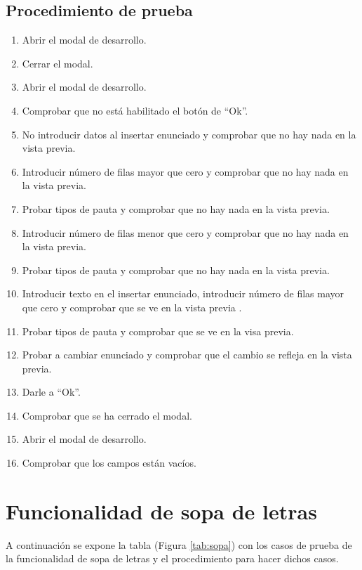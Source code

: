 \subsection{Procedimiento de prueba}
\label{procedimientoPruebas:desarrollo}
\begin{enumerate}
\item Abrir el modal de desarrollo.
\item Cerrar el modal.
\item Abrir el modal de desarrollo.
\item Comprobar que no está habilitado el botón de ``Ok''.
\item No introducir datos al insertar enunciado y comprobar que no hay nada en la vista previa. 
\item Introducir número de filas mayor que cero y comprobar que no hay nada en la vista previa.
\item Probar tipos de pauta y comprobar que no hay nada en la vista previa.
\item Introducir número de filas menor que cero y comprobar que no hay nada en la vista previa.
\item Probar tipos de pauta y comprobar que no hay nada en la vista previa.
\item Introducir texto en el insertar enunciado, introducir número de filas mayor que cero y comprobar que se ve en la vista previa .
\item Probar tipos de pauta y comprobar que se ve en la visa previa.
\item Probar a cambiar enunciado y comprobar que el cambio se refleja en la vista previa.
\item Darle a ``Ok''.
\item Comprobar que se ha cerrado el modal.
\item Abrir el modal de desarrollo.
\item Comprobar que los campos están vacíos.
\end{enumerate}

\section{Funcionalidad de sopa de letras}
\label{planPruebas:sopa}
A continuación se expone la tabla (Figura \ref{tab:sopa}) con los casos de prueba de la funcionalidad de sopa de letras y el procedimiento para hacer dichos casos.

